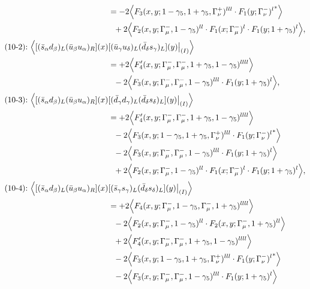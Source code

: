 \begin{align}
&=
-2\Big\langle F_3(x,y;1-\gamma_5,1+\gamma_5,\Gamma_\nu^+)^{lll} \cdot {F_1(y;\Gamma_\nu^-)^l}^*\Big\rangle
\notag\\*&\ \ 
 + 2\Big\langle F_2(x,y;\Gamma_\mu^-,1-\gamma_5)^{ll} \cdot F_1(x;\Gamma_\mu^-)^l \cdot F_1(y;1+\gamma_5)^l\Big\rangle,
\\
\mbox{(10-2):}\ 
\Big\langle
[(\bar s_\alpha d_\beta)_L(\bar u_\beta u_\alpha)_R](x)&
[(\bar u_\gamma u_\delta)_L(\bar d_\delta s_\gamma)_L](y)\big|_{(I)}
\Big\rangle
\notag\\*
&=
 + 2\Big\langle F_4'(x,y;\Gamma_\mu^-,\Gamma_\mu^-,1+\gamma_5,1-\gamma_5)^{llll}\Big\rangle
\notag\\*&\ \ 
-2\Big\langle F_3(x,y;\Gamma_\mu^-,\Gamma_\mu^-,1-\gamma_5)^{lll} \cdot F_1(y;1+\gamma_5)^l\Big\rangle,
\\
\mbox{(10-3):}\ 
\Big\langle
[(\bar s_\alpha d_\beta)_L(\bar u_\beta u_\alpha)_R](x)&
[(\bar d_\gamma d_\gamma)_L(\bar d_\delta s_\delta)_L](y)\big|_{(I)}
\Big\rangle
\notag\\*
&=
 + 2\Big\langle F_4'(x,y;\Gamma_\mu^-,\Gamma_\mu^-,1+\gamma_5,1-\gamma_5)^{llll}\Big\rangle
\notag\\*&\ \ 
-2\Big\langle F_3(x,y;1-\gamma_5,1+\gamma_5,\Gamma_\nu^+)^{lll} \cdot {F_1(y;\Gamma_\nu^-)^l}^*\Big\rangle
\notag\\*&\ \ 
-2\Big\langle F_3(x,y;\Gamma_\mu^-,\Gamma_\mu^-,1-\gamma_5)^{lll} \cdot F_1(y;1+\gamma_5)^l\Big\rangle
\notag\\*&\ \ 
 + 2\Big\langle F_2(x,y;\Gamma_\mu^-,1-\gamma_5)^{ll} \cdot F_1(x;\Gamma_\mu^-)^l \cdot F_1(y;1+\gamma_5)^l\Big\rangle,
\\
\mbox{(10-4):}\ 
\Big\langle
[(\bar s_\alpha d_\beta)_L(\bar u_\beta u_\alpha)_R](x)&
[(\bar s_\gamma s_\gamma)_L(\bar d_\delta s_\delta)_L](y)\big|_{(I)}
\Big\rangle
\notag\\*
&=
 + 2\Big\langle F_4(x,y;\Gamma_\mu^-,1-\gamma_5,\Gamma_\mu^-,1+\gamma_5)^{llll}\Big\rangle
\notag\\*&\ \ 
-2\Big\langle F_2(x,y;\Gamma_\mu^-,1-\gamma_5)^{ll} \cdot F_2(x,y;\Gamma_\mu^-,1+\gamma_5)^{ll}\Big\rangle
\notag\\*&\ \ 
 + 2\Big\langle F_4'(x,y;\Gamma_\mu^-,\Gamma_\mu^-,1+\gamma_5,1-\gamma_5)^{llll}\Big\rangle
\notag\\*&\ \ 
-2\Big\langle F_3(x,y;1-\gamma_5,1+\gamma_5,\Gamma_\nu^+)^{lll} \cdot {F_1(y;\Gamma_\nu^-)^l}^*\Big\rangle
\notag\\*&\ \ 
-2\Big\langle F_3(x,y;\Gamma_\mu^-,\Gamma_\mu^-,1-\gamma_5)^{lll} \cdot F_1(y;1+\gamma_5)^l\Big\rangle

\end{align}
